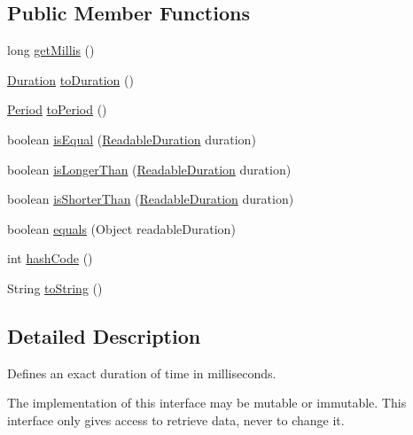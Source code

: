 \subsection*{Public Member Functions}
\begin{DoxyCompactItemize}
\item 
long \hyperlink{interfaceorg_1_1joda_1_1time_1_1_readable_duration_a44d83457d428ca176e47a5ac583e36ef}{get\-Millis} ()
\item 
\hyperlink{classorg_1_1joda_1_1time_1_1_duration}{Duration} \hyperlink{interfaceorg_1_1joda_1_1time_1_1_readable_duration_a1ff142535ab33814293f70ce43966811}{to\-Duration} ()
\item 
\hyperlink{classorg_1_1joda_1_1time_1_1_period}{Period} \hyperlink{interfaceorg_1_1joda_1_1time_1_1_readable_duration_a6469ee7602c2ff2de3eb572b123f4795}{to\-Period} ()
\item 
boolean \hyperlink{interfaceorg_1_1joda_1_1time_1_1_readable_duration_a0c8d26d5ca9eddedd3f5f5dc4b62dc0f}{is\-Equal} (\hyperlink{interfaceorg_1_1joda_1_1time_1_1_readable_duration}{Readable\-Duration} duration)
\item 
boolean \hyperlink{interfaceorg_1_1joda_1_1time_1_1_readable_duration_a692f8f0bfbd274e00b5deefc0611c230}{is\-Longer\-Than} (\hyperlink{interfaceorg_1_1joda_1_1time_1_1_readable_duration}{Readable\-Duration} duration)
\item 
boolean \hyperlink{interfaceorg_1_1joda_1_1time_1_1_readable_duration_a567ea3d429b0e9b1eb40205c5eafd869}{is\-Shorter\-Than} (\hyperlink{interfaceorg_1_1joda_1_1time_1_1_readable_duration}{Readable\-Duration} duration)
\item 
boolean \hyperlink{interfaceorg_1_1joda_1_1time_1_1_readable_duration_aa52f93180da256d9438481047495003d}{equals} (Object readable\-Duration)
\item 
int \hyperlink{interfaceorg_1_1joda_1_1time_1_1_readable_duration_aaebeac4290e0798278b11df6645cd6da}{hash\-Code} ()
\item 
String \hyperlink{interfaceorg_1_1joda_1_1time_1_1_readable_duration_aa4cfa2f458a763ad29ac570956c72697}{to\-String} ()
\end{DoxyCompactItemize}


\subsection{Detailed Description}
Defines an exact duration of time in milliseconds. 

The implementation of this interface may be mutable or immutable. This interface only gives access to retrieve data, never to change it. 

